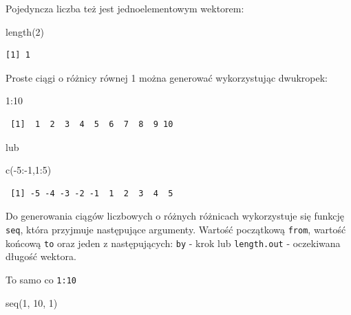 \documentclass[
  letterpaper,
  DIV=11,
  numbers=noendperiod]{scrreprt}
\newenvironment{Shaded}{\begin{snugshade}}{\end{snugshade}}
\newcommand{\DecValTok}[1]{\textcolor[rgb]{0.68,0.00,0.00}{#1}}
\newcommand{\FunctionTok}[1]{\textcolor[rgb]{0.28,0.35,0.67}{#1}}
\newcommand{\NormalTok}[1]{\textcolor[rgb]{0.00,0.23,0.31}{#1}}
\newcommand{\SpecialCharTok}[1]{\textcolor[rgb]{0.37,0.37,0.37}{#1}}
\begin{document}
Pojedyncza liczba też jest jednoelementowym wektorem:

\begin{Shaded}
\begin{Highlighting}[]
\FunctionTok{length}\NormalTok{(}\DecValTok{2}\NormalTok{)}
\end{Highlighting}
\end{Shaded}

\begin{verbatim}
[1] 1
\end{verbatim}

Proste ciągi o różnicy równej 1 można generować wykorzystując dwukropek:

\begin{Shaded}
\begin{Highlighting}[]
\DecValTok{1}\SpecialCharTok{:}\DecValTok{10}
\end{Highlighting}
\end{Shaded}

\begin{verbatim}
 [1]  1  2  3  4  5  6  7  8  9 10
\end{verbatim}

lub

\begin{Shaded}
\begin{Highlighting}[]
\FunctionTok{c}\NormalTok{(}\SpecialCharTok{{-}}\DecValTok{5}\SpecialCharTok{:{-}}\DecValTok{1}\NormalTok{,}\DecValTok{1}\SpecialCharTok{:}\DecValTok{5}\NormalTok{)}
\end{Highlighting}
\end{Shaded}

\begin{verbatim}
 [1] -5 -4 -3 -2 -1  1  2  3  4  5
\end{verbatim}

Do generowania ciągów liczbowych o różnych różnicach wykorzystuje się
funkcję \texttt{seq}, która przyjmuje następujące argumenty. Wartość
początkową \texttt{from}, wartość końcową \texttt{to} oraz jeden z
następujących: \texttt{by} - krok lub \texttt{length.out} - oczekiwana
długość wektora.

To samo co \texttt{1:10}

\begin{Shaded}
\begin{Highlighting}[]
\FunctionTok{seq}\NormalTok{(}\DecValTok{1}\NormalTok{, }\DecValTok{10}\NormalTok{, }\DecValTok{1}\NormalTok{)}
\end{Highlighting}
\end{Shaded}
\end{document}
